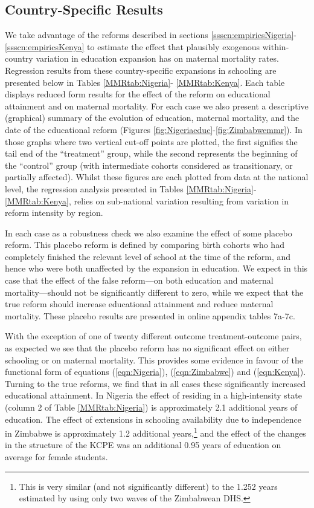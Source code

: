 \documentclass{article}[12pt,subeqn]
\begin{document}
\begin{spacing}{1.4}
\subsection{Country-Specific Results}
\label{sscn:casestudies}
We take advantage of the reforms described in sections 
\ref{ssscn:empiricsNigeria}-\ref{ssscn:empiricsKenya} to estimate the effect that 
plausibly exogenous within-country variation in education expansion has on 
maternal mortality rates. Regression results from these country-specific 
expansions in schooling are presented below in Tables \ref{MMRtab:Nigeria}-%
\ref{MMRtab:Kenya}. Each table displays reduced form results for the effect of 
the reform on educational attainment and on maternal mortality. For each case we 
also present a descriptive (graphical) summary of the evolution of education, 
maternal mortality, and the date of the educational reform (Figures 
\ref{fig:Nigeriaeduc}-\ref{fig:Zimbabwemmr}). In those graphs where two vertical 
cut-off points are plotted, the first signifies the tail end of the ``treatment'' 
group, while the second represents the beginning of the ``control'' group (with 
intermediate cohorts considered as transitionary, or partially affected). Whilst 
these figures are each plotted from data at the national level, the regression 
analysis presented in Tables \ref{MMRtab:Nigeria}-\ref{MMRtab:Kenya}, relies on 
sub-national variation resulting from variation in reform intensity by region. 

In each case as a robustness check we also examine the effect of some placebo 
reform. This placebo reform is defined by comparing birth cohorts who had 
completely finished the relevant level of school at the time of the reform, and 
hence who were both unaffected by the expansion in education.  We expect in this 
case that the effect of the false reform---on both education and maternal 
mortality---should not be significantly different to zero, while we expect that 
the true reform should increase educational attainment and reduce maternal 
mortality.  These placebo results are presented in online appendix tables 
7a-7c.

With the exception of one of twenty different outcome treatment-outcome pairs, as 
expected we see that the placebo reform has no significant effect on either 
schooling or on maternal mortality.  This provides some evidence in favour of the 
functional form of equations (\ref{eqn:Nigeria}), (\ref{eqn:Zimbabwe}) and 
(\ref{eqn:Kenya}). Turning to the true reforms, we find that in all cases these 
significantly increased educational attainment. In Nigeria the effect of residing 
in a high-intensity state (column 2 of Table \ref{MMRtab:Nigeria}) is approximately 
2.1 additional years of education.  The effect of extensions in schooling 
availability due to independence in Zimbabwe is approximately 1.2 additional 
years,\footnote{This is very similar (and not significantly different) to the 
1.252 years estimated by \citet{AgueroBharawadj2011} using only two waves of the 
Zimbabwean DHS.} and the effect of the changes in the structure of the KCPE was an 
additional 0.95 years of education on average for female students.


\end{spacing}
\end{document}

